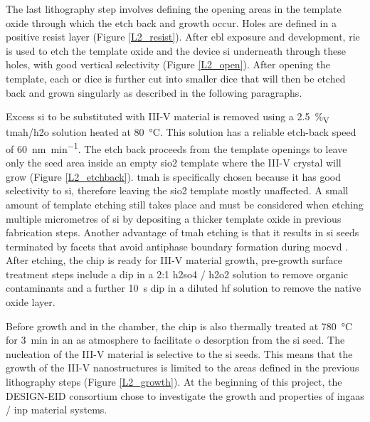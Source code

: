 The last lithography step involves defining the opening areas in the template oxide through which the etch back and growth occur. Holes are defined in a positive resist layer (Figure \ref{L2_resist}). After \acs{ebl} exposure and development, \acs{rie} is used to etch the template oxide and the device \acl{si} underneath through these holes, with good vertical selectivity (Figure \ref{L2_open}). After opening the template, each  or  dice is further cut into smaller  dice that will then be etched back and grown singularly as described in the following paragraphs.
\par
Excess \acl{si} to be substituted with III-V material is removed using a \qty{2.5}{\%_{V\per\V}} \acf{tmah}/\acf{h2o} solution heated at \qty{80}{\degreeCelsius}. This solution has a reliable etch-back speed of \qty{60}{\nm\per\minute}.  The etch back proceeds from the template openings to leave only the seed area inside an empty \acl{sio2} template where the III-V crystal will grow (Figure \ref{L2_etchback}). \Acs{tmah} is specifically chosen because it has good selectivity to \acl{si}, therefore leaving the \acs{sio2} template mostly unaffected. A small amount of template etching still takes place and must be considered when etching multiple micrometres of \acl{si} by depositing a thicker template oxide in previous fabrication steps. Another advantage of \acs{tmah} etching is that it results in \acl{si} seeds terminated by  facets that avoid antiphase boundary formation during \acf{mocvd} \cite{Kunert2018}. After etching, the chip is ready for III-V material growth, pre-growth surface treatment steps include a dip in a 2:1 \acf{h2so4} / \acf{h2o2} solution to remove organic contaminants and a further \qty{10}{s} dip in a diluted \acs{hf} solution to remove the native oxide layer. 
\par
Before growth and in the chamber, the chip is also thermally treated at \qty{780}{\degreeCelsius} for \qty{3}{\minute} in an \acs{as} atmosphere to facilitate \acl{o} desorption from the \acl{si} seed. The nucleation of the III-V material is selective to the \acl{si} seeds. This means that the growth of the III-V nanostructures is limited to the areas defined in the previous lithography steps (Figure \ref{L2_growth}). At the beginning of this project, the DESIGN-EID consortium chose to investigate the growth and properties of \acf{ingaas} / \acf{inp} material systems.

